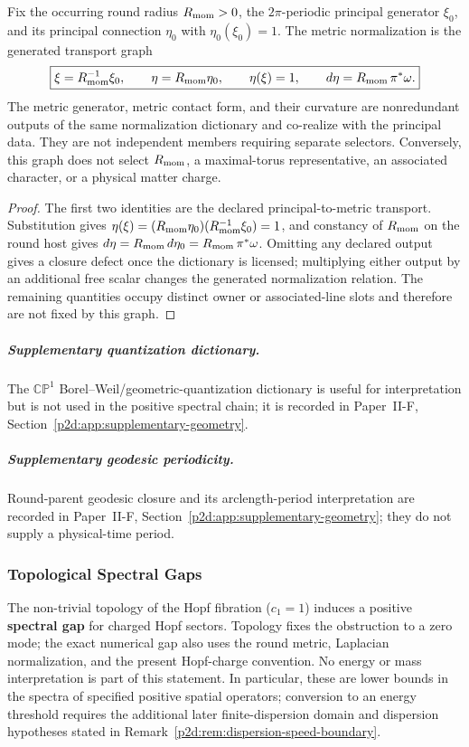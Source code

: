 \documentclass[12pt,a4paper]{article}
\begin{document}
\begin{corollary}
\label{p2d:cor:generated-hopf-normalization-graph}
Fix the occurring round radius \(R_{\mathrm{mom}}>0\), the \(2\pi\)-periodic principal
generator \(\xi_0\), and its principal connection \(\eta_0\) with
\(\eta_0(\xi_0)=1\).  The metric normalization is the generated transport
graph
\[
 \boxed{
 \xi=R_{\mathrm{mom}}^{-1}\xi_0,\qquad
 \eta=R_{\mathrm{mom}}\eta_0,\qquad
 \eta(\xi)=1,\qquad
 d\eta=R_{\mathrm{mom}}\,\pi^*\omega.}
\]
The metric generator, metric contact form, and their curvature are
nonredundant outputs of the same normalization dictionary and co-realize with
the principal data.  They are not independent members requiring separate
selectors.  Conversely, this graph does not select \(R_{\mathrm{mom}}\), a maximal-torus
representative, an associated character, or a physical matter charge.
\end{corollary}

\begin{proof}
The first two identities are the declared principal-to-metric transport.
Substitution gives
\(\eta(\xi)=(R_{\mathrm{mom}}\eta_0)(R_{\mathrm{mom}}^{-1}\xi_0)=1\), and constancy of
\(R_{\mathrm{mom}}\) on the round host gives
\(d\eta=R_{\mathrm{mom}}\,d\eta_0=R_{\mathrm{mom}}\,\pi^*\omega\).
Omitting any declared output gives a closure defect once the dictionary is
licensed; multiplying either output by an additional free scalar changes the
generated normalization relation.  The remaining quantities occupy distinct
owner or associated-line slots and therefore are not fixed by this graph.
\end{proof}


\subparagraph{Supplementary quantization dictionary.}
The \(\mathbb{CP}^1\) Borel--Weil/geometric-quantization dictionary is useful
for interpretation but is not used in the positive spectral chain; it is
recorded in Paper~II-F, Section~\ref{p2d:app:supplementary-geometry}.

\subparagraph{Supplementary geodesic periodicity.}
Round-parent geodesic closure and its arclength-period interpretation are
recorded in Paper~II-F, Section~\ref{p2d:app:supplementary-geometry}; they do not supply
a physical-time period.

\subsubsection{Topological Spectral Gaps}
\label{p2:sec:kinematic-spectral-gaps}

The non-trivial topology of the Hopf fibration ($c_1 = 1$) induces a positive
\textbf{spectral gap} for charged Hopf sectors.  Topology fixes the
obstruction to a zero mode; the exact numerical gap also uses the round
metric, Laplacian normalization, and the present Hopf-charge convention.  No
energy or mass interpretation is part of this statement.  In particular,
these are lower bounds in the spectra of specified positive spatial
operators; conversion to an energy threshold requires the additional
later finite-dispersion domain and dispersion hypotheses stated in
Remark~\ref{p2d:rem:dispersion-speed-boundary}.
\end{document}
